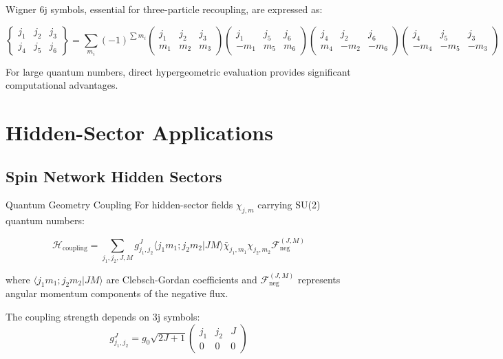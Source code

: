 \documentclass[12pt]{article}
\begin{document}
Wigner 6j symbols, essential for three-particle recoupling, are expressed as:

\begin{equation}
\begin{Bmatrix}
j_1 & j_2 & j_3 \\
j_4 & j_5 & j_6
\end{Bmatrix} = \sum_{m_i} (-1)^{\sum m_i} \begin{pmatrix} j_1 & j_2 & j_3 \\ m_1 & m_2 & m_3 \end{pmatrix} \begin{pmatrix} j_1 & j_5 & j_6 \\ -m_1 & m_5 & m_6 \end{pmatrix} \begin{pmatrix} j_4 & j_2 & j_6 \\ m_4 & -m_2 & -m_6 \end{pmatrix} \begin{pmatrix} j_4 & j_5 & j_3 \\ -m_4 & -m_5 & -m_3 \end{pmatrix}
\end{equation}

For large quantum numbers, direct hypergeometric evaluation provides significant computational advantages.

\section{Hidden-Sector Applications}

\subsection{Spin Network Hidden Sectors}

\begin{physicsbox}{Quantum Geometry Coupling}
For hidden-sector fields $\chi_{j,m}$ carrying SU(2) quantum numbers:

\begin{equation}
\mathcal{H}_{\text{coupling}} = \sum_{j_1,j_2,J,M} g_{j_1,j_2}^J \langle j_1 m_1; j_2 m_2 | J M \rangle \bar{\chi}_{j_1,m_1} \chi_{j_2,m_2} \mathcal{F}_{\text{neg}}^{(J,M)}
\end{equation}

where $\langle j_1 m_1; j_2 m_2 | J M \rangle$ are Clebsch-Gordan coefficients and $\mathcal{F}_{\text{neg}}^{(J,M)}$ represents angular momentum components of the negative flux.

The coupling strength depends on 3j symbols:
\begin{equation}
g_{j_1,j_2}^J = g_0 \sqrt{2J+1} \begin{pmatrix} j_1 & j_2 & J \\ 0 & 0 & 0 \end{pmatrix}
\end{equation}
\end{physicsbox}
\end{document}
